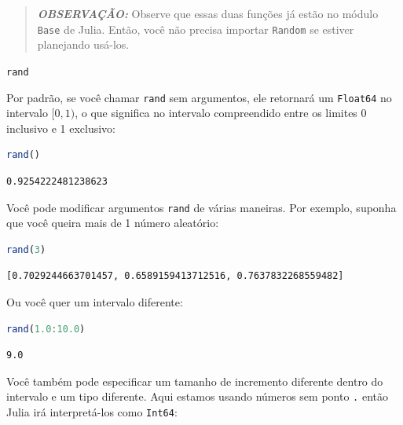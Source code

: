 \documentclass[
  notoc %
]{tufte-book}
\makeatletter
\newcommand{\passthrough}[1]{#1}
\renewcommand\subsubsection{%
\@startsection{subsubsection}{3}{\z@ }{-3.25ex\@plus -1ex \@minus -.2ex}{1.5ex \@plus .2ex}{\normalfont \normalsize \bfseries }
}
\makeatother
\begin{document}
\begin{quote}
\textbf{\emph{OBSERVAÇÃO:}} Observe que essas duas funções já estão no
módulo \passthrough{\lstinline!Base!} de Julia. Então, você não precisa
importar \passthrough{\lstinline!Random!} se estiver planejando usá-los.
\end{quote}

\hypertarget{sec:random_rand}{%
\subsubsection{\texorpdfstring{\texttt{rand}}{rand}}\label{sec:random_rand}}

Por padrão, se você chamar \passthrough{\lstinline!rand!} sem
argumentos, ele retornará um \passthrough{\lstinline!Float64!} no
intervalo \([0, 1)\), o que significa no intervalo compreendido entre os
limites 0 inclusivo e 1 exclusivo:

\begin{lstlisting}[language=Julia]
rand()
\end{lstlisting}

\begin{lstlisting}[language=Output]
0.9254222481238623
\end{lstlisting}

Você pode modificar argumentos \passthrough{\lstinline!rand!} de várias
maneiras. Por exemplo, suponha que você queira mais de 1 número
aleatório:

\begin{lstlisting}[language=Julia]
rand(3)
\end{lstlisting}

\begin{lstlisting}[language=Output]
[0.7029244663701457, 0.6589159413712516, 0.7637832268559482]
\end{lstlisting}

Ou você quer um intervalo diferente:

\begin{lstlisting}[language=Julia]
rand(1.0:10.0)
\end{lstlisting}

\begin{lstlisting}[language=Output]
9.0
\end{lstlisting}

Você também pode especificar um tamanho de incremento diferente dentro
do intervalo e um tipo diferente. Aqui estamos usando números sem ponto
\passthrough{\lstinline!.!} então Julia irá interpretá-los como
\passthrough{\lstinline!Int64!}:
\end{document}
